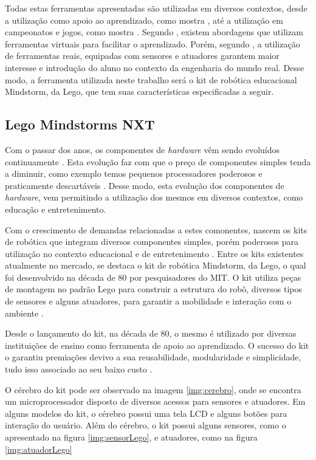 	Todas estas ferramentas apresentadas são utilizadas em diversos contextos, desde a utilização como apoio ao aprendizado, como mostra \cite{teachingWithRoboticKit}, até a utilização em campeonatos e jogos, como mostra \cite{ciber-rato}. Segundo \cite{analiseFerramentaEnsinoComputacao}, existem abordagens que utilizam ferramentas virtuais para facilitar o aprendizado. Porém, segundo \cite{simpleMobile}, a utilização de ferramentas reais, equipadas com sensores e atuadores garantem maior interesse e introdução do aluno no contexto da engenharia do mundo real. Desse modo, a ferramenta utilizada neste trabalho será o kit de robótica educacional Mindstorm, da Lego, que tem suas características especificadas a seguir.

\subsection{Lego Mindstorms NXT} %
\label{sub:kit_mindstorm}

Com o passar dos anos, os componentes de \textit{hardware} vêm sendo evoluídos continuamente \cite{teachingWithRoboticKit}. Esta evolução faz com que o preço de componentes simples tenda a diminuir, como exemplo temos pequenos processadores poderosos e praticamente descartáveis \cite{teachingWithRoboticKit}. Desse modo, esta evolução dos componentes de \textit{hardware}, vem permitindo a utilização dos mesmos em diversos contextos, como educação e entretenimento. 

Com o crescimento de demandas relacionadas a estes comonentes, nascem os kits de robótica que integram diversos componentes simples, porém poderosos para utilização no contexto educacional e de entretenimento \cite{teachingWithRoboticKit}. Entre os kits existentes atualmente no mercado, se destaca o kit de robótica Mindstorm, da Lego, o qual foi desenvolvido na década de 80 por pesquisadores do MIT. O kit utiliza peças de montagem no padrão Lego para construir a estrutura do robô, diversos tipos de sensores e alguns atuadores, para garantir a mobilidade e interação com o ambiente \cite{teachingWithRoboticKit}.

Desde o lançamento do kit, na década de 80, o mesmo é utilizado por diversas instituições de ensino como ferramenta de apoio ao aprendizado. O sucesso do kit o garantiu premiações devivo a sua reusabilidade, modularidade e simplicidade, tudo isso associado ao seu baixo custo \cite{teachingWithRoboticKit}.

O cérebro do kit pode ser observado na imagem \ref{img:cerebro}, onde se encontra um microprocessador disposto de diversos acessos para sensores e atuadores. Em alguns modelos do kit, o cérebro possui uma tela LCD e alguns botões para interação do usuário. Além do cérebro, o kit possui alguns sensores, como o apresentado na figura \ref{img:sensorLego}, e atuadores, como na figura \ref{img:atuadorLego}

